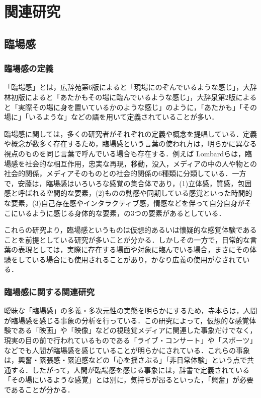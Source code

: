 \chapter{関連研究}
\thispagestyle{fancy} %
\lhead{}
\chead{}
\rhead{}
\lfoot{} 
\cfoot{\thepage}  
\rfoot{}
%

\section{臨場感}
\label{sec2.1}

\subsection{臨場感の定義}
\label{sec2.1.1}

「臨場感」とは，広辞苑第6版によると「現場にのぞんでいるような感じ」，大辞林初版によると「あたかもその場に臨んでいるような感じ」，大辞泉第2版によると「実際その場に身を置いているかのような感じ」のように，「あたかも」「その場に」「いるような」などの語を用いて定義されていることが多い\cite{rinjyo1}．

臨場感に関しては，多くの研究者がそれぞれの定義や概念を提唱している．定義や概念が数多く存在するため，臨場感という言葉の使われ方は，明らかに異なる視点のものを同じ言葉で呼んでいる場合も存在する．例えば Lombardらは，臨場感を社会的な相互作用，忠実な再現，移動，没入，メディアの中の人や物との社会的関係，メディアそのものとの社会的関係の6種類に分類している\cite{lombard}．一方で，安藤は，臨場感はいろいろな感覚の集合体であり，(1)立体感，質感，包囲感と呼ばれる空間的な要素，(2)ものの動感や同期している感覚といった時間的な要素，(3)自己存在感やインタラクティブ感，情感などを伴って自分自身がそこにいるように感じる身体的な要素，の3つの要素があるとしている\cite{ando}．

これらの研究より，臨場感というものは仮想的あるいは懐疑的な感覚体験であることを前提としている研究が多いことが分かる．しかしその一方で，日常的な言葉の表現としては，実際に存在する場面や対象に臨んでいる場合，まさにその体験をしている場合にも使用されることがあり，かなり広義の使用がなされている．




\subsection{臨場感に関する関連研究}
\label{sec2.1.2}
  
曖昧な「臨場感」の多義・多次元性の実態を明らかにするため，寺本らは，人間が臨場感を感じる事象の分析を行っている\cite{rinjyo2}．この研究によって，仮想的な感覚体験である「映画」や「映像」などの視聴覚メディアに関連した事象だけでなく，現実の目の前で行われているものである「ライブ・コンサート」や「スポーツ」などでも人間が臨場感を感じていることが明らかにされている．これらの事象は，興奮・緊張感・緊迫感などの「心を揺さぶる」「非日常体験」という点で共通する．したがって，人間が臨場感を感じる事象には，辞書で定義されている「その場にいるような感覚」とは別に，気持ちが昂るといった，「興奮」が必要であることが分かる．

